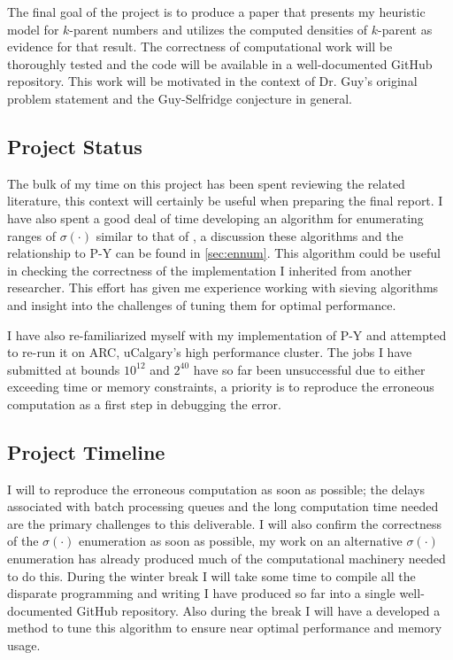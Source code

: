 \documentclass{article}
\theoremstyle{definition}
\begin{document}
The final goal of the project is to produce a paper that presents my heuristic model for $k$-parent numbers and utilizes the computed densities of $k$-parent as evidence for that result. The correctness of computational work will be thoroughly tested and the code will be available in a well-documented GitHub repository. This work will be motivated in the context of Dr. Guy's original problem statement and the Guy-Selfridge conjecture in general.

\subsection{Project Status}
The bulk of my time on this project has been spent reviewing the related literature, this context will certainly be useful when preparing the final report. I have also spent a good deal of time developing an algorithm for enumerating ranges of $\sigma(\cdot)$ similar to that of \cite{moews_moews_1991}, a discussion these algorithms and the relationship to P-Y can be found in \autoref{sec:ennum}. This algorithm could be useful in checking the correctness of the implementation I inherited from another researcher. This effort has given me experience working with sieving algorithms and insight into the challenges of tuning them for optimal performance.

I have also re-familiarized myself with my implementation of P-Y and attempted to re-run it on ARC, uCalgary's high performance cluster. The jobs I have submitted at bounds $10^{12}$ and $2^{40}$ have so far been unsuccessful due to either exceeding time or memory constraints, a priority is to reproduce the erroneous computation as a first step in debugging the error.

\subsection{Project Timeline}
I will to reproduce the erroneous computation as soon as possible; the delays associated with batch processing queues and the long computation time needed are the primary challenges to this deliverable. I will also confirm the correctness of the $\sigma(\cdot)$ enumeration as soon as possible, my work on an alternative $\sigma(\cdot)$ enumeration has already produced much of the computational machinery needed to do this. During the winter break I will take some time to compile all the disparate programming and writing I have produced so far into a single well-documented GitHub repository. Also during the break I will have a developed a method to tune this algorithm to ensure near optimal performance and memory usage. 
\end{document}
